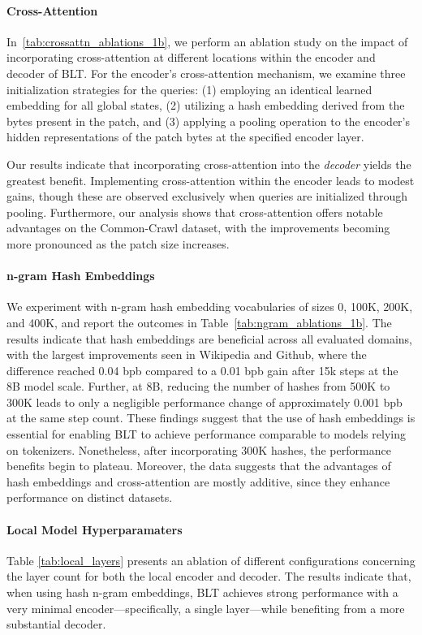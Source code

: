 \paragraph{Cross-Attention} 
In~\autoref{tab:crossattn_ablations_1b}, we perform an ablation study on the impact of incorporating cross-attention at different locations within the encoder and decoder of {\textsc BLT}. For the encoder's cross-attention mechanism, we examine three initialization strategies for the queries: (1) employing an identical learned embedding for all global states, (2) utilizing a hash embedding derived from the bytes present in the patch, and (3) applying a pooling operation to the encoder’s hidden representations of the patch bytes at the specified encoder layer.

Our results indicate that incorporating cross-attention into the \textit{decoder} yields the greatest benefit. Implementing cross-attention within the encoder leads to modest gains, though these are observed exclusively when queries are initialized through pooling. Furthermore, our analysis shows that cross-attention offers notable advantages on the Common-Crawl dataset, with the improvements becoming more pronounced as the patch size increases.

\paragraph{n-gram Hash Embeddings} 

We experiment with n-gram hash embedding vocabularies of sizes 0, 100K, 200K, and 400K, and report the outcomes in Table~\ref{tab:ngram_ablations_1b}. The results indicate that hash embeddings are beneficial across all evaluated domains, with the largest improvements seen in Wikipedia and Github, where the difference reached 0.04 bpb compared to a 0.01 bpb gain after 15k steps at the 8B model scale. Further, at 8B, reducing the number of hashes from 500K to 300K leads to only a negligible performance change of approximately 0.001 bpb at the same step count. These findings suggest that the use of hash embeddings is essential for enabling {\textsc BLT} to achieve performance comparable to models relying on tokenizers. Nonetheless, after incorporating 300K hashes, the performance benefits begin to plateau. Moreover, the data suggests that the advantages of hash embeddings and cross-attention are mostly additive, since they enhance performance on distinct datasets.

\paragraph{Local Model Hyperparamaters} Table \ref{tab:local_layers} presents an ablation of different configurations concerning the layer count for both the local encoder and decoder. The results indicate that, when using hash n-gram embeddings, {\textsc BLT} achieves strong performance with a very minimal encoder—specifically, a single layer—while benefiting from a more substantial decoder.

